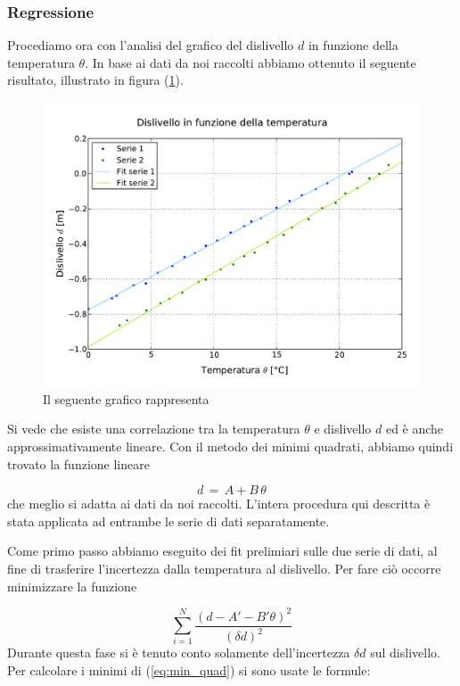 \subsubsection{Regressione}

Procediamo ora con l'analisi del grafico del dislivello $d$ in funzione della temperatura $\theta$.
In base ai dati da noi raccolti abbiamo ottenuto il seguente risultato, illustrato in figura (\ref{fig:dislivello_temperatura}).

\begin{figure}
    \centering
    \includegraphics[width=120mm]{immagini/dislivello_temperatura.pdf}
    \caption{Il seguente grafico rappresenta}
    \label{fig:dislivello_temperatura}
\end{figure}
%
Si vede che esiste una correlazione tra la temperatura $\theta$ e dislivello $d$ ed è anche approssimativamente lineare.
Con il metodo dei minimi quadrati, abbiamo quindi trovato la funzione lineare

\begin{equation}
	d \,=\, A + B\,\theta
	\label{h_theta}
\end{equation}
%
che meglio si adatta ai dati da noi raccolti. L'intera procedura qui descritta è stata
applicata ad entrambe le serie di dati separatamente.

Come primo passo abbiamo eseguito dei fit prelimiari sulle due serie di dati,
al fine di trasferire l'incertezza dalla temperatura al dislivello.
Per fare ciò occorre minimizzare la funzione

\begin{equation}
    \sum_{i=1}^{N} \frac{(d - A' - B'\theta)^2}{(\delta d)^2}
    \label{eq:min_quad}
\end{equation}
%
Durante questa fase si è tenuto conto solamente dell'incertezza $\delta d$ sul dislivello. Per calcolare i minimi
di (\ref{eq:min_quad}) si sono usate le formule:

